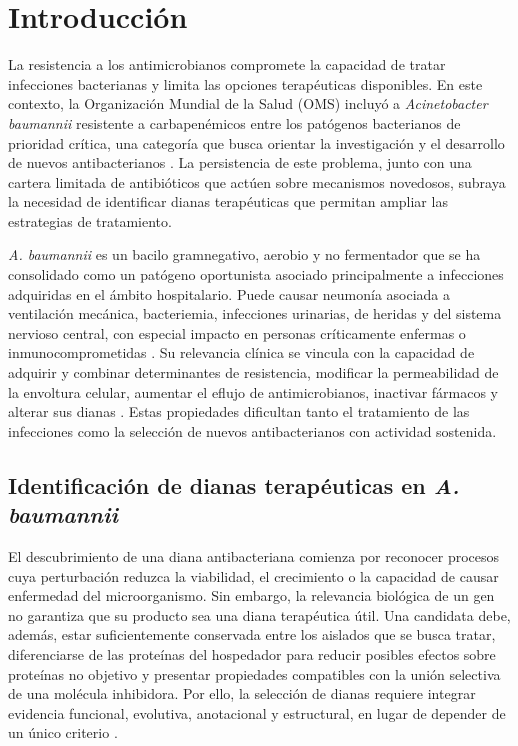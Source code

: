 \chapter{Introducción}

La resistencia a los antimicrobianos compromete la capacidad de tratar infecciones bacterianas y limita las opciones terapéuticas disponibles. En este contexto, la Organización Mundial de la Salud (OMS) incluyó a \textit{Acinetobacter baumannii} resistente a carbapenémicos entre los patógenos bacterianos de prioridad crítica, una categoría que busca orientar la investigación y el desarrollo de nuevos antibacterianos \cite{WHO2024BPPL}. La persistencia de este problema, junto con una cartera limitada de antibióticos que actúen sobre mecanismos novedosos, subraya la necesidad de identificar dianas terapéuticas que permitan ampliar las estrategias de tratamiento.

\textit{A. baumannii} es un bacilo gramnegativo, aerobio y no fermentador que se ha consolidado como un patógeno oportunista asociado principalmente a infecciones adquiridas en el ámbito hospitalario. Puede causar neumonía asociada a ventilación mecánica, bacteriemia, infecciones urinarias, de heridas y del sistema nervioso central, con especial impacto en personas críticamente enfermas o inmunocomprometidas \cite{Peleg2008}. Su relevancia clínica se vincula con la capacidad de adquirir y combinar determinantes de resistencia, modificar la permeabilidad de la envoltura celular, aumentar el eflujo de antimicrobianos, inactivar fármacos y alterar sus dianas \cite{Zhu2024}. Estas propiedades dificultan tanto el tratamiento de las infecciones como la selección de nuevos antibacterianos con actividad sostenida.

\section{Identificación de dianas terapéuticas en \textit{A. baumannii}}

El descubrimiento de una diana antibacteriana comienza por reconocer procesos cuya perturbación reduzca la viabilidad, el crecimiento o la capacidad de causar enfermedad del microorganismo. Sin embargo, la relevancia biológica de un gen no garantiza que su producto sea una diana terapéutica útil. Una candidata debe, además, estar suficientemente conservada entre los aislados que se busca tratar, diferenciarse de las proteínas del hospedador para reducir posibles efectos sobre proteínas no objetivo y presentar propiedades compatibles con la unión selectiva de una molécula inhibidora. Por ello, la selección de dianas requiere integrar evidencia funcional, evolutiva, anotacional y estructural, en lugar de depender de un único criterio \cite{Bosch2024}.

